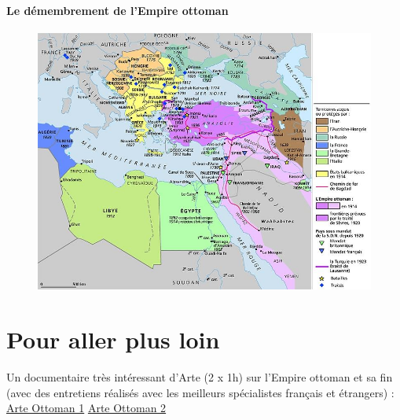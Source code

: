 \paragraph{Le démembrement de
l’Empire ottoman}
\begin{figure}
    \centering
    \includegraphics[width=\textwidth]{HistoireIslamMediterranee/Images/DemembrementEmpireOttoman2.jpg}

    \label{fig:my_label}
\end{figure}

 \section{Pour aller plus loin}

 Un documentaire très intéressant d’Arte (2 x 1h) sur l’Empire ottoman
et sa fin (avec des entretiens réalisés avec les meilleurs spécialistes
français et étrangers) :
\href{https://www.dailymotion.com/video/x4a7vu8}{Arte Ottoman 1}
\href{Https://www.dailymotion.com/video/x3zpz4e}{Arte Ottoman 2}

